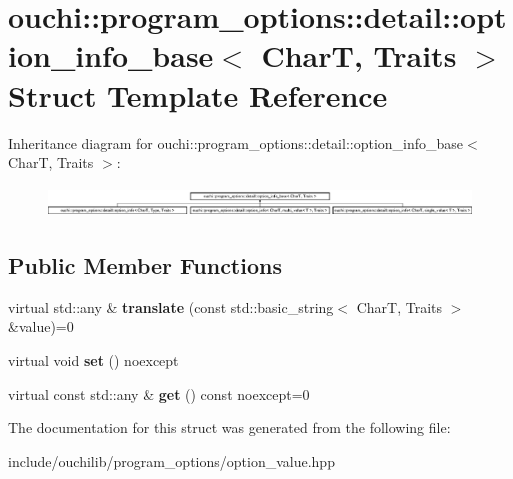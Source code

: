\hypertarget{structouchi_1_1program__options_1_1detail_1_1option__info__base}{}\section{ouchi\+::program\+\_\+options\+::detail\+::option\+\_\+info\+\_\+base$<$ CharT, Traits $>$ Struct Template Reference}
\label{structouchi_1_1program__options_1_1detail_1_1option__info__base}
Inheritance diagram for ouchi\+::program\+\_\+options\+::detail\+::option\+\_\+info\+\_\+base$<$ CharT, Traits $>$\+:\begin{figure}[H]
\begin{center}
\leavevmode
\includegraphics[height=0.802867cm]{structouchi_1_1program__options_1_1detail_1_1option__info__base}
\end{center}
\end{figure}
\subsection*{Public Member Functions}
\begin{DoxyCompactItemize}
\item 
\mbox{\label{structouchi_1_1program__options_1_1detail_1_1option__info__base_a00c903bc0e40e22af1493b271d848b6d}} 
virtual std\+::any \& {\bfseries translate} (const std\+::basic\+\_\+string$<$ CharT, Traits $>$ \&value)=0
\item 
\mbox{\label{structouchi_1_1program__options_1_1detail_1_1option__info__base_a233de3ed5acd30cea7f3396ff126d8fc}} 
virtual void {\bfseries set} () noexcept
\item 
\mbox{\label{structouchi_1_1program__options_1_1detail_1_1option__info__base_a7a347a4b8cd1b05b3b82b516ee6ca5c2}} 
virtual const std\+::any \& {\bfseries get} () const noexcept=0
\end{DoxyCompactItemize}


The documentation for this struct was generated from the following file\+:\begin{DoxyCompactItemize}
\item 
include/ouchilib/program\+\_\+options/option\+\_\+value.\+hpp\end{DoxyCompactItemize}
